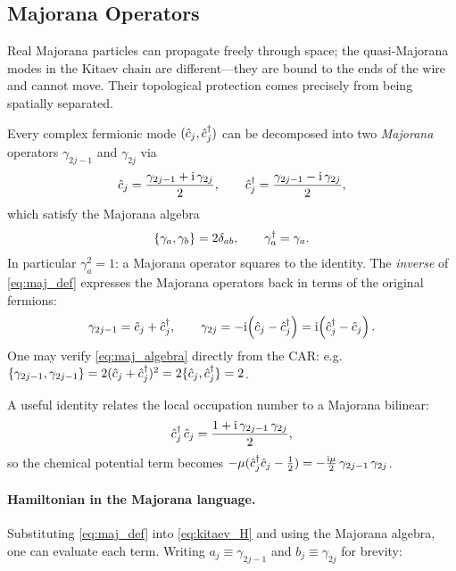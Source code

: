 \subsection{Majorana Operators}

\begin{inter}
Real Majorana particles can propagate freely through space; the quasi-Majorana modes in the Kitaev chain are different---they are bound to the ends of the wire and cannot move. Their topological protection comes precisely from being spatially separated.
\end{inter}

Every complex fermionic mode $(\hat{c}_j, \hat{c}_j^{\dag})$ can be decomposed into two \emph{Majorana} operators $\gamma_{2j-1}$ and $\gamma_{2j}$ via
\begin{align}
    \hat{c}_j = \frac{\gamma_{2j-1} + \mathrm{i}\,\gamma_{2j}}{2}, \qquad
    \hat{c}_j^{\dag} = \frac{\gamma_{2j-1} - \mathrm{i}\,\gamma_{2j}}{2},
    \label{eq:maj_def}
\end{align}
which satisfy the Majorana algebra
\begin{align}
    \left\{ \gamma_a , \gamma_b \right\} = 2\delta_{ab}, \qquad \gamma_a^{\dag} = \gamma_a.
    \label{eq:maj_algebra}
\end{align}
In particular $\gamma_a^2 = 1$: a Majorana operator squares to the identity. The \emph{inverse} of \eqref{eq:maj_def} expresses the Majorana operators back in terms of the original fermions:
\begin{align}
    \gamma_{2j-1} = \hat{c}_j + \hat{c}_j^{\dag}, \qquad
    \gamma_{2j} = -\mathrm{i}\!\left(\hat{c}_j - \hat{c}_j^{\dag}\right) = \mathrm{i}\!\left(\hat{c}_j^{\dag} - \hat{c}_j\right).
    \label{eq:maj_inv}
\end{align}
One may verify \eqref{eq:maj_algebra} directly from the CAR: e.g.\ $\{\gamma_{2j-1},\gamma_{2j-1}\} = 2(\hat{c}_j + \hat{c}_j^{\dag})^2 = 2\{\hat{c}_j,\hat{c}_j^{\dag}\} = 2$.

A useful identity relates the local occupation number to a Majorana bilinear:
\begin{align}
    \hat{c}_j^{\dag}\,\hat{c}_j = \frac{1 + \mathrm{i}\,\gamma_{2j-1}\,\gamma_{2j}}{2},
    \label{eq:occ_maj}
\end{align}
so the chemical potential term becomes $-\mu(\hat{c}_j^{\dag}\hat{c}_j - \tfrac{1}{2}) = -\tfrac{\mathrm{i}\mu}{2}\,\gamma_{2j-1}\,\gamma_{2j}$.

\paragraph{Hamiltonian in the Majorana language.}
Substituting \eqref{eq:maj_def} into \eqref{eq:kitaev_H} and using the Majorana algebra, one can evaluate each term. Writing $a_j \equiv \gamma_{2j-1}$ and $b_j \equiv \gamma_{2j}$ for brevity:

